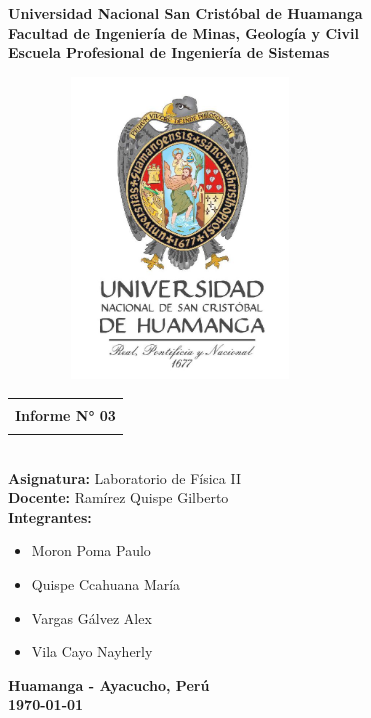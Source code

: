 \begin{titlepage}
\begin{center}
	{\LARGE\textbf{Universidad Nacional San Cristóbal de Huamanga}}\\
	\vspace{0.5cm}
	{\LARGE\textbf{Facultad de Ingeniería de Minas, Geología y Civil}}\\
	\vspace{0.5cm}
	{\LARGE\textbf{Escuela Profesional de Ingeniería de Sistemas}}\\
	\vspace{1cm}
	\begin{figure}[h]
		\centering
		\includegraphics[width=7cm, height=8cm]{imagenes/logo.jpg}
	\end{figure}
	\vspace{0.5cm}
	\begin{tabular}{|c|}
		\hline
		\\
		{\Large\textbf{ Informe N° 03  }}\\
		\\
		\hline
	\end{tabular}\\
	\vspace{0.5cm}
	{\Large\textbf{Asignatura: } Laboratorio de Física II}\\
	\vspace{0.2cm}
	{\Large\textbf{Docente: } Ramírez Quispe Gilberto}\\
	\vspace{0.2cm}
	{\Large\textbf{Integrantes: }}
	
	\begin{itemize}
		\centering		
		\item {\Large Moron Poma Paulo}
		\item {\Large Quispe Ccahuana María}
		\item {\Large Vargas Gálvez Alex} 
		\item {\Large Vila Cayo Nayherly}
	\end{itemize}
	\vspace{1.5cm}
	{\huge \textbf{Huamanga - Ayacucho, Perú}}\\
	\vspace{0.5cm}
	{\huge \textbf{\today}}
\end{center}
\end{titlepage}